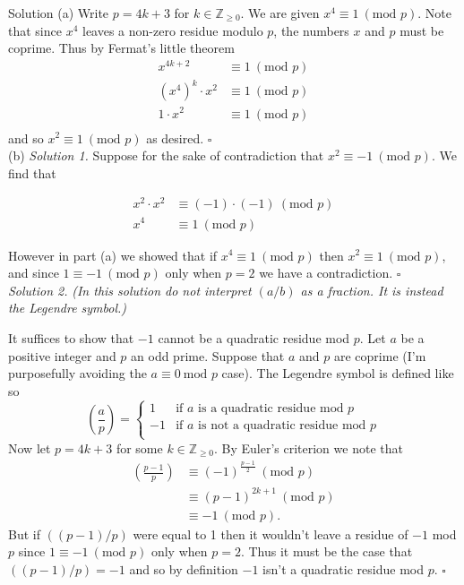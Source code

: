 \documentclass{article}
\begin{document}
\begin{solution}{Solution}
(a) Write $p = 4k+3$ for $k \in \mathbb{Z}_{\geq0}$.
We are given $x^4 \equiv 1 \ (\text{mod } p)$.
Note that since $x^4$ leaves a non-zero residue modulo $p$, the numbers
$x$ and $p$ must be coprime. Thus by Fermat's little theorem
\[
\begin{aligned}
x^{4k+2} &\equiv 1 \ (\text{mod } p) \\
(x^4)^k \cdot x^2 &\equiv 1 \ (\text{mod } p) \\
1 \cdot x^2 &\equiv 1 \ (\text{mod } p) \\
\end{aligned}
\]
and so $x^2 \equiv 1 \ (\text{mod } p)$ as desired. $\square$\\

(b) \textit{Solution 1.} Suppose for the sake of contradiction that
$x^2 \equiv -1 \ (\text{mod } p)$. We find that

\[
\begin{aligned}
x^2 \cdot x^2 &\equiv (-1) \cdot (-1) \ (\text{mod } p) \\
x^4 &\equiv 1 \ (\text{mod } p)
\end{aligned}
\]

However in part (a) we showed that if $x^4 \equiv 1 \ (\text{mod } p)$ then
$x^2 \equiv 1 \ (\text{mod } p)$, and since $1 \equiv -1 \ (\text{mod } p)$
only when $p = 2$ we have a contradiction. $\square$
\\

\textit{Solution 2.} \textit{(In this solution do not interpret $(a/b)$
as a fraction. It is instead the Legendre symbol.)}
\vspace{0.1cm}

It suffices to show that $-1$ cannot be a
quadratic residue mod $p$.
Let $a$ be a positive integer and $p$ an odd prime.
Suppose that $a$ and $p$ are coprime (I'm purposefully avoiding the
$a\equiv 0 \ \text{mod } p$ case).
The Legendre symbol is defined like so
$$
\left( \frac{a}{p} \right) =
\begin{cases}
1 & \text{if $a$ is a quadratic residue mod $p$}\\
-1 & \text{if $a$ is not a quadratic residue mod $p$}\\
\end{cases}
$$
Now let $p = 4k+3$ for some $k \in \mathbb{Z}_{\geq0}$. By Euler's
criterion we note that
\[
\begin{aligned}
\left( \frac{p-1}{p} \right) &\equiv (-1)^{\frac{p-1}{2}} \ (\text{mod } p)\\
&\equiv (p-1)^{2k + 1} \ (\text{mod } p)\\
&\equiv -1 \ (\text{mod } p).
\end{aligned}
\]
But if $((p-1) / p)$ were equal to 1 then it wouldn't leave a residue of $-1$
mod $p$ since $1 \equiv -1 \ (\text{mod } p)$ only when $p=2$. Thus it must
be the case that $((p-1) / p) = -1$ and so by definition
$-1$ isn't a quadratic residue mod $p$. $\square$
\\


\end{solution}
\end{document}
